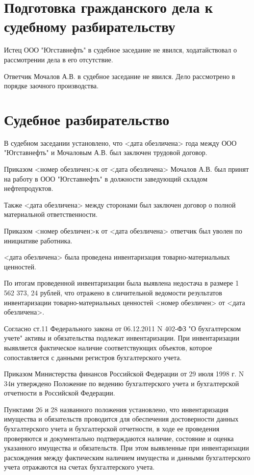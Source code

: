\documentclass[a4paper]{article}
\begin{document}
	\section{Подготовка гражданского дела к судебному разбирательству}
		Истец ООО "Югставнефть" в судебное заседание не явился, ходатайствовал о рассмотрении дела в его отсутствие.
		
		Ответчик Мочалов А.В. в судебное заседание не явился. Дело рассмотрено в порядке заочного производства.
		
	\section{Судебное разбирательство}
		В судебном заседании установлено, что <дата обезличена> года между ООО "Югставнефть" и Мочаловым А.В. был заключен трудовой договор.
		
		Приказом <номер обезличен>к от <дата обезличена> Мочалов А.В. был принят на работу в ООО "Югставнефть" в должности заведующий складом нефтепродуктов.
		
		Также <дата обезличена> между сторонами был заключен договор о полной материальной ответственности.
		
		Приказом <номер обезличен>к от <дата обезличена> ответчик был уволен по инициативе работника.
		
		<дата обезличена> была проведена инвентаризация товарно-материальных ценностей.
		
		По итогам проведенной инвентаризации была выявлена недостача в размере 1 562 373, 24 рублей, что отражено в сличительной ведомости результатов инвентаризации товарно-материальных ценностей <номер обезличен> от <дата обезличена>.
		
		Согласно ст.11 Федерального закона от 06.12.2011 N 402-ФЗ "О бухгалтерском учете" активы и обязательства подлежат инвентаризации. При инвентаризации выявляется фактическое наличие соответствующих объектов, которое сопоставляется с данными регистров бухгалтерского учета.
		
		Приказом Министерства финансов Российской Федерации от 29 июля 1998 г. N 34н утверждено Положение по ведению бухгалтерского учета и бухгалтерской отчетности в Российской Федерации.
		
		Пунктами 26 и 28 названного положения установлено, что инвентаризация имущества и обязательств проводится для обеспечения достоверности данных бухгалтерского учета и бухгалтерской отчетности, в ходе ее проведения проверяются и документально подтверждаются наличие, состояние и оценка указанного имущества и обязательств. При этом выявленные при инвентаризации расхождения между фактическим наличием имущества и данными бухгалтерского учета отражаются на счетах бухгалтерского учета.
		
\end{document}
